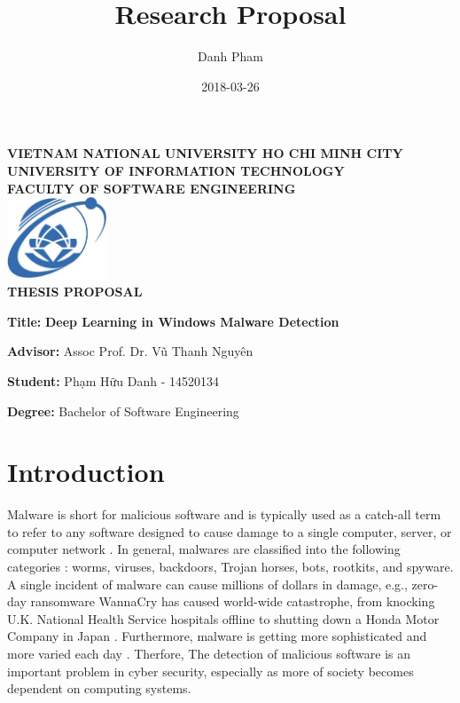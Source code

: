 \documentclass[12pt, a4paper]{article}
\title{Research Proposal}
\author{Danh Pham}
\date{2018-03-26}
\newcommand{\namelistlabel}[1]{\mbox{#1}\hfil}
\newenvironment{namelist}[1]{%
\begin{list}{}
    {
        \let\makelabel\namelistlabel
        \settowidth{\labelwidth}{#1}
        \setlength{\leftmargin}{1.1\labelwidth}
    }
  }{%
\end{list}}
\begin{document}
\begin{center}
\textbf{VIETNAM NATIONAL UNIVERSITY HO CHI MINH CITY} \\[2mm]
\textbf{UNIVERSITY OF INFORMATION TECHNOLOGY} \\ [2mm]
\textbf{FACULTY OF SOFTWARE ENGINEERING} \\ [1cm]
\includegraphics[width=30mm]{UIT_Logo} \\
\vspace{0.5cm}
\Large \textbf{THESIS PROPOSAL}
\vspace{0.5cm}
\end{center}


\begin{namelist}{Information}
\item[{\bf Title:}]
	\textbf{ \large Deep Learning in Windows Malware Detection}
\item[{\bf Advisor:}]
	Assoc Prof. Dr. Vũ Thanh Nguyên
\item[{\bf Student:}]
	Phạm Hữu Danh - 14520134
\item[{\bf Degree:}]
	Bachelor of Software Engineering
\end{namelist}

\section*{Introduction}

Malware is short for malicious software and is typically used as a catch-all term to refer to any software designed to cause damage to a single computer, server, or computer network \cite{moir2003defining}. In general, malwares are classified into the following categories \cite{egele2012survey}: worms, viruses, backdoors, Trojan horses, bots, rootkits, and spyware. A single incident of malware can cause millions of dollars in damage, e.g., zero-day ransomware WannaCry has caused world-wide catastrophe, from knocking U.K. National Health Service hospitals offline to shutting down a Honda Motor Company in Japan \cite{DBLP:journals/corr/abs-1709-08753}. Furthermore, malware is getting more sophisticated and more varied each day \cite{shahi2009technology}. Therfore, The detection of malicious software is an important problem in cyber security, especially as more of society becomes dependent on computing systems.
\end{document}
